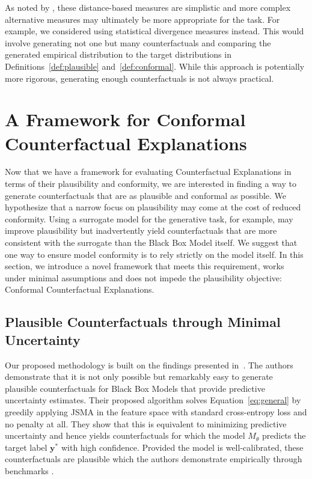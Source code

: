 \documentclass{article}
\begin{document}
As noted by \citet{guidotti2022counterfactual}, these distance-based measures are simplistic and more complex alternative measures may ultimately be more appropriate for the task. For example, we considered using statistical divergence measures instead. This would involve generating not one but many counterfactuals and comparing the generated empirical distribution to the target distributions in Definitions~\ref{def:plausible} and~\ref{def:conformal}. While this approach is potentially more rigorous, generating enough counterfactuals is not always practical. 

\section{A Framework for Conformal Counterfactual Explanations}\label{cce}

Now that we have a framework for evaluating Counterfactual Explanations in terms of their plausibility and conformity, we are interested in finding a way to generate counterfactuals that are as plausible and conformal as possible. We hypothesize that a narrow focus on plausibility may come at the cost of reduced conformity. Using a surrogate model for the generative task, for example, may improve plausibility but inadvertently yield counterfactuals that are more consistent with the surrogate than the Black Box Model itself. We suggest that one way to ensure model conformity is to rely strictly on the model itself. In this section, we introduce a novel framework that meets this requirement, works under minimal assumptions and does not impede the plausibility objective: Conformal Counterfactual Explanations.

\subsection{Plausible Counterfactuals through Minimal Uncertainty}

Our proposed methodology is built on the findings presented in~\citet{schut2021generating}. The authors demonstrate that it is not only possible but remarkably easy to generate plausible counterfactuals for Black Box Models that provide predictive uncertainty estimates. Their proposed algorithm solves Equation~\ref{eq:general} by greedily applying JSMA in the feature space with standard cross-entropy loss and no penalty at all. They show that this is equivalent to minimizing predictive uncertainty and hence yields counterfactuals for which the model $M_{\theta}$ predicts the target label $\mathbf{y}^*$ with high confidence. Provided the model is well-calibrated, these counterfactuals are plausible which the authors demonstrate empirically through benchmarks \citep{schut2021generating}.
\end{document}
